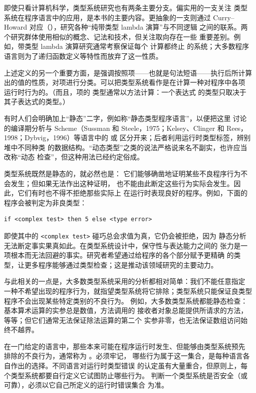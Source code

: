 即使只看计算机科学，类型系统研究也有两条主要分支。偏实用的一支关注
类型系统在程序语言中的应用，是本书的主要内容。更抽象的一支则通过
Curry--Howard 对应（），研究各种“纯带类型
lambda 演算”与不同逻辑
之间的联系。两个研究群体使用相似的概念、记法和技术，但关注取向存在一些
重要差别。例如，带类型 lambda 演算研究通常考察保证每个
计算都终止
的系统；大多数程序语言则为了递归函数定义等特性而放弃了这一性质。

上述定义的另一个重要方面，是强调按照项——也就是句法短语——执行后所计算
出的值的性质，对项进行分类。可以把类型系统看作是在计算一种对程序中各项
运行时行为的。（而且，项的
类型通常以方法计算：一个表达式
的类型只取决于其子表达式的类型。）

有时人们会明确加上“静态”二字，例如称“静态类型程序语言”，以便把这里
讨论的编译期分析与 Scheme（Sussman 和 Steele，1975；Kelsey、Clinger 和
Rees，1998；Dybvig，1996）等语言中的
或
区分开来；后者利用运行时类型标签，辨别堆中不同种类
的数据结构。“动态类型”之类的说法严格说来名不副实，也许应当改称“动态
检查”，但这种用法已经约定俗成。

类型系统既然是静态的，就必然也是：
它们能够确凿地证明某些不良程序行为不会发生；但如果无法作出这种证明，
也不能由此断定这些行为实际会发生。因此，它们有时也不得不拒绝那些实际上
在运行时表现良好的程序。例如，下面的程序会被判定为非良类型：

\begin{lstlisting}
if <complex test> then 5 else <type error>
\end{lstlisting}

即使其中的 \texttt{<complex test>} 碰巧总会求值为真，它仍会被拒绝，因为
静态分析无法断定事实果真如此。在类型系统设计中，保守性与表达能力之间的
张力是一项根本而无法回避的事实。研究者希望通过给程序的各个部分赋予更精确
的类型，让更多程序能够通过类型检查；这是推动该领域研究的主要动力。

与此相关的一点是，大多数类型系统采用的分析都相对简单：我们不能任意指定
一种不希望出现的程序行为，就指望类型系统将它排除；类型系统只能保证良类型
程序不会出现某些特定类别的不良行为。
例如，大多数类型系统都能静态检查：基本算术运算的实参总是数值，方法调用的
接收者对象总能提供所请求的方法，等等；但它们通常无法保证除法运算的第二个
实参非零，也无法保证数组访问始终不越界。

在一门给定的语言中，那些本来可能在程序运行时发生、但能够由类型系统预先
排除的不良行为，通常称为
。必须牢记，
哪些行为属于这一集合，是每种语言各自作出的选择。不同语言对运行时类型错误
的认定虽有大量重合，但原则上，每个类型系统都要自行定义它试图防止哪些行为。
判断一个类型系统是否安全（或可靠），必须以它自己所定义的运行时错误集合
为准。

